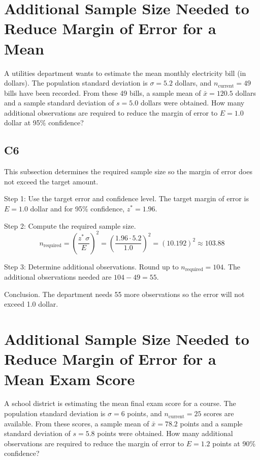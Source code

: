 \begin{ExamProblems}
		\item
		\section{Additional Sample Size Needed to Reduce Margin of Error for a Mean}
		A utilities department wants to estimate the mean monthly electricity bill (in dollars). The population standard deviation is $\sigma = 5.2$ dollars, and $n_{\text{current}} = 49$ bills have been recorded. From these 49 bills, a sample mean of $\bar{x} = 120.5$ dollars and a sample standard deviation of $s = 5.0$ dollars were obtained. How many additional observations are required to reduce the margin of error to $E = 1.0$ dollar at 95\% confidence?
		
		\subsection*{C6}
		This subsection determines the required sample size so the margin of error does not exceed the target amount.
		
		Step 1: Use the target error and confidence level. The target margin of error is $E = 1.0$ dollar and for 95\% confidence, $z^* = 1.96$.
		
		Step 2: Compute the required sample size.
		\[
		n_{\text{required}} = \left(\frac{z^*\,\sigma}{E}\right)^2
		= \left(\frac{1.96 \cdot 5.2}{1.0}\right)^2
		= \left(10.192\right)^2
		\approx 103.88
		\]
		
		Step 3: Determine additional observations. Round up to $n_{\text{required}} = 104$. The additional observations needed are $104 - 49 = 55$.
		
		Conclusion. The department needs 55 more observations so the error will not exceed 1.0 dollar.
		
		\item
		\section{Additional Sample Size Needed to Reduce Margin of Error for a Mean Exam Score}
		A school district is estimating the mean final exam score for a course. The population standard deviation is $\sigma = 6$ points, and $n_{\text{current}} = 25$ scores are available. From these scores, a sample mean of $\bar{x} = 78.2$ points and a sample standard deviation of $s = 5.8$ points were obtained. How many additional observations are required to reduce the margin of error to $E = 1.2$ points at 90\% confidence?
		

\end{ExamProblems}
